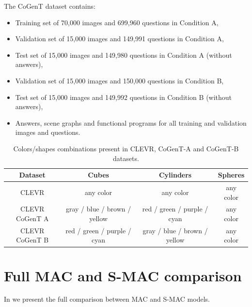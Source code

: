 The CoGenT dataset contains:
\begin{itemize}
\item	Training set of 70,000 images and 699,960 questions in Condition A,
\item	Validation set of 15,000 images and 149,991 questions in Condition A,
\item	Test set of 15,000 images and 149,980 questions in Condition A (without answers),
\item	Validation set of 15,000 images and 150,000 questions in Condition B,
\item	Test set of 15,000 images and 149,992 questions in Condition B (without answers),
\item	Answers, scene graphs and functional programs for all training and validation images and questions.
\end{itemize}

\begin{table}[h!]
	\centering
	\begin{tabular}{cccc}
		\toprule
		Dataset        & Cubes              & Cylinders &  Spheres         \\
		\midrule
		CLEVR   &  any color &  any color        &    any color    \\
		CLEVR CoGenT A & gray / blue / brown / yellow  & red / green / purple / cyan       &    any color  \\
		CLEVR CoGenT B  & red / green / purple / cyan &   gray / blue / brown / yellow       &      any color  \\
		\bottomrule
	\end{tabular}
	\caption{Colors/shapes combinations present in CLEVR, CoGenT-A and CoGenT-B datasets.}
	\label{tab:cogent_conditions}
\end{table}

 
 \newpage
\section{Full MAC and S-MAC comparison}

In  we present the full comparison between MAC and S-MAC models.


